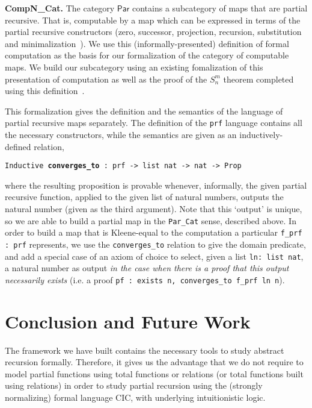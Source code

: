 \documentclass{entcs} \usepackage{entcsmacro}
\begin{document}
{\bfseries CompN\_Cat.} The category $\mathsf{Par}$ contains a subcategory of maps that are partial recursive. That is, computable by a map which can be expressed in terms of the partial recursive constructors (zero, successor, projection, recursion, substitution and minimalization~\cite{Computability}). We use this (informally-presented) definition of formal computation as the basis for our formalization of the category of computable maps. We build our subcategory using an existing fomalization of this presentation of computation as well as the proof of the $S^m_n$ theorem completed using this definition~\cite{SmnForm}.

This formalization gives the definition and the semantics of the language of partial recursive maps separately. The definition of the {\tt \small prf} language contains all the necessary constructors, while the semantics are given as an inductively-defined relation, 

{\tt \scriptsize Inductive {\bfseries converges\_to} : prf -> list nat -> nat -> Prop} 

\noindent where the resulting proposition is provable whenever, informally, the given partial recursive function, applied to the given list of natural numbers, outputs the natural number (given as the third argument). Note that this `output' is unique, so we are able to build a partial map in the {\tt \small Par\_Cat} sense, described above. In order to build a map that is Kleene-equal to the computation a particular {\tt \small f\_prf : prf} represents, we use the {\tt \small converges\_to} relation to give the domain predicate, and add a special case of an axiom of choice to select, given a list {\tt \small ln: list nat}, a natural number as output \textit{in the case when there is a proof that this output necessarily exists} (i.e. a proof {\tt \small pf : exists n, converges\_to f\_prf ln n}). 

\section{Conclusion and Future Work}

The framework we have built contains the necessary tools to study abstract recursion formally. Therefore, it gives us the advantage that we do not require to model partial functions using total functions or relations (or total functions built using relations) in order to study partial recursion using the (strongly normalizing) formal language CIC, with underlying intuitionistic logic. 
\end{document}

